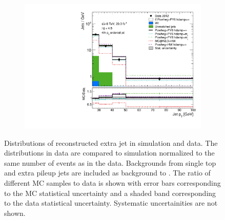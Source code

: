 \begin{figure}
\begin{subfigure}[]{0.45\textwidth}
\end{subfigure}
\begin{subfigure}[]{0.45\textwidth}
\includegraphics[width=\textwidth]{fig/MCComp/NLO/RecoPtJet3.pdf}
\end{subfigure}
\caption{Distributions of reconstructed extra jet \pt in simulation and data. The distributions in data are compared to \ttbar simulation normalized to the same number of events as in the data. Backgrounds from single top and extra pileup jets are included as background to \ttbar. The ratio of different MC samples to data is shown with error bars corresponding to the MC statistical uncertainty and a shaded band corresponding to the data statistical uncertainty. Systematic uncertainities are not shown.}
\label{fig:recojetpt}
\end{figure}

